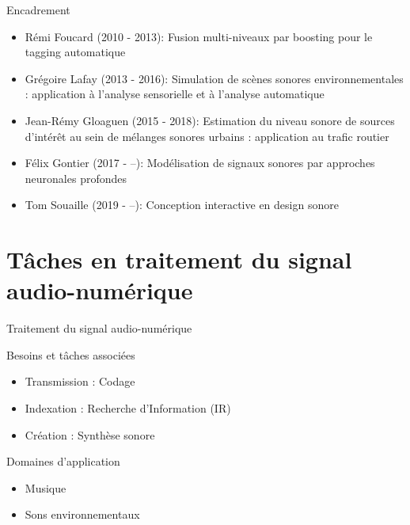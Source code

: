 \documentclass[compress]{beamer}
\begin{document}
\begin{frame}{Encadrement}
\begin{itemize}
  \item Rémi Foucard (2010 - 2013): \og Fusion multi-niveaux par boosting pour le tagging automatique \fg
  \item Grégoire Lafay (2013 - 2016): \og Simulation de scènes sonores environnementales : application à l'analyse sensorielle et à l'analyse automatique \fg
  \item Jean-Rémy Gloaguen (2015 - 2018): \og Estimation du niveau sonore de sources d'intérêt au sein de mélanges sonores urbains : application au trafic routier \fg
  \item Félix Gontier (2017 - --): \og Modélisation de signaux sonores par approches neuronales profondes \fg
  \item Tom Souaille (2019 - --): \og Conception interactive en design sonore \fg
\end{itemize}
\end{frame}

\section[Tâches]{Tâches en traitement du signal audio-numérique}


\begin{frame}{Traitement du signal audio-numérique}
\begin{block}{Besoins et tâches associées}
\begin{itemize}
\item Transmission : Codage
\item Indexation : Recherche d'Information (IR)
\item Création : Synthèse sonore
\end{itemize}
\end{block}
\begin{block}{Domaines d'application}
\begin{itemize}
\item Musique
\item Sons environnementaux
\end{itemize}
\end{block}
\end{frame}
\end{document}
